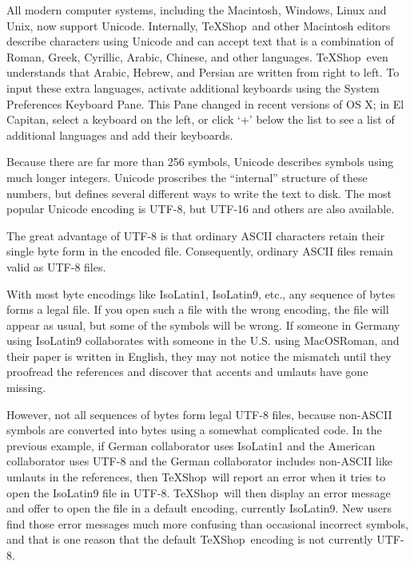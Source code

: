 \documentclass[letterpaper,11pt]{article}
\newcommand{\TS}{\textsf{\TeX Shop}}
\newcommand{\acr}[1]{\textsf{#1}}
\newcommand{\cmd}[1]{\textsf{#1}}
\begin{document}
All modern computer systems, including the Macintosh, Windows, Linux and Unix, now support Unicode. Internally, \TS\ and other Macintosh editors describe characters using Unicode
and can accept text that is a combination of Roman, Greek, Cyrillic, Arabic, Chinese, and other languages. \TS\ even understands that Arabic, Hebrew, and Persian are written from right to left. To input these extra languages, activate additional keyboards using
the \cmd{System Preferences} \cmd{Keyboard} Pane. This Pane changed in recent versions of OS X;
in El Capitan, select a keyboard on the left, or click `+' below the list to see a list of
additional languages and add their keyboards.

Because there are far more than 256 symbols, Unicode describes symbols using much longer integers. Unicode proscribes the ``internal'' structure of these numbers, but defines
several different ways to write the text to disk. The most popular Unicode encoding is UTF-8, but UTF-16 and others are also available.

The great advantage of UTF-8 is that ordinary ASCII characters retain their single byte form in the encoded file. Consequently, ordinary ASCII files remain valid as UTF-8 files. 

With most byte encodings like \acr{IsoLatin1}, \acr{IsoLatin9}, etc., any sequence of bytes forms a legal file. If you open such a file with the wrong encoding, the file will appear as usual, but some of the symbols will be wrong. If someone in Germany using \acr{IsoLatin9} collaborates with someone in the U.S. using \acr{MacOSRoman}, and their paper is written in English,
they may not notice the mismatch until they proofread the references and discover that
accents and umlauts have gone missing.

However, not all sequences of bytes form legal \acr{UTF-8} files, because non-\acr{ASCII} symbols 
are converted into bytes using a somewhat complicated code. In the previous example,
if German collaborator uses \acr{IsoLatin1} and the American collaborator uses \acr{UTF-8} and the
German collaborator includes non-\acr{ASCII} like umlauts in the references, then
\TS\ will report an error when it tries to open the \acr{IsoLatin9} file in \acr{UTF-8}.  \TS\ will then display an error message and  offer to open the file in a default
encoding, currently \acr{IsoLatin9}. New users find those error messages much more confusing
than occasional incorrect symbols, and that is one reason that the default \TS\ encoding is not currently \acr{UTF-8}.
\end{document}
